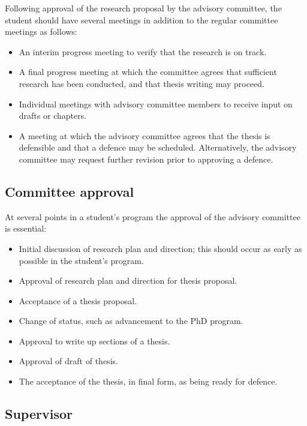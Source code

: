 \documentclass[12pt]{article}
\begin{document}
Following approval of the research proposal by the advisory committee, the
student should have several meetings in addition to the regular committee
meetings as follows:
\begin{itemize}

\item An interim progress meeting to verify that the research is on track.

\item A final progress meeting at which the committee agrees that sufficient
research has been conducted, and that thesis writing may proceed.

\item Individual meetings with advisory committee members to receive input on drafts or chapters.

\item A meeting at which the advisory committee agrees that the thesis is
defensible and that a defence may be scheduled. Alternatively, the advisory
committee may request further revision prior to approving a defence.

\end{itemize}





\subsection{Committee approval}


At several points in a student's program the approval of the advisory committee is essential:
\begin{itemize}
\item Initial discussion of research plan and direction; this should occur as early as possible in the student's program.
\item Approval of research plan and direction for thesis proposal.
\item Acceptance of a thesis proposal.
\item Change of status, such as advancement to the PhD program.
\item Approval to write up sections of a thesis.
\item Approval of draft of thesis.
\item The acceptance of the thesis, in final form, as being ready for defence.
\end{itemize}


\subsection{Supervisor}
\end{document}
